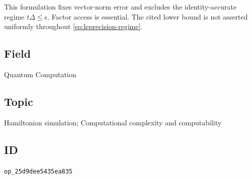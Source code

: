 This formulation fixes vector-norm error and excludes the identity-accurate regime $t\Delta\leq\epsilon$. Factor access is essential. The cited lower bound is not asserted uniformly throughout \eqref{eq:leprecision-regime}.

\subsection*{Field}

Quantum Computation

\subsection*{Topic}

Hamiltonian simulation; Computational complexity and computability

\subsection*{ID}

\texttt{op\_25d9dee5435ea835}
